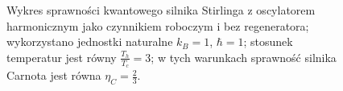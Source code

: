 \begin{figure}[h]
	\begin{subfigure}{0.45\textwidth}
		\centering
		
	\end{subfigure}
	\begin{subfigure}{0.45\textwidth}
		\centering
		
	\end{subfigure}
	\caption{Wykres sprawności kwantowego silnika Stirlinga z oscylatorem harmonicznym jako czynnikiem roboczym i bez regeneratora; wykorzystano jednostki naturalne \(k_B = 1\), \(\hbar = 1\); stosunek temperatur jest równy \(\frac{T_h}{T_c} = 3\); w tych warunkach sprawność silnika Carnota jest równa \(\eta_C = \frac{2}{3}\).}
	\label{fig:wykres_kw_stirling_osc_harm_bezreg}
\end{figure}


